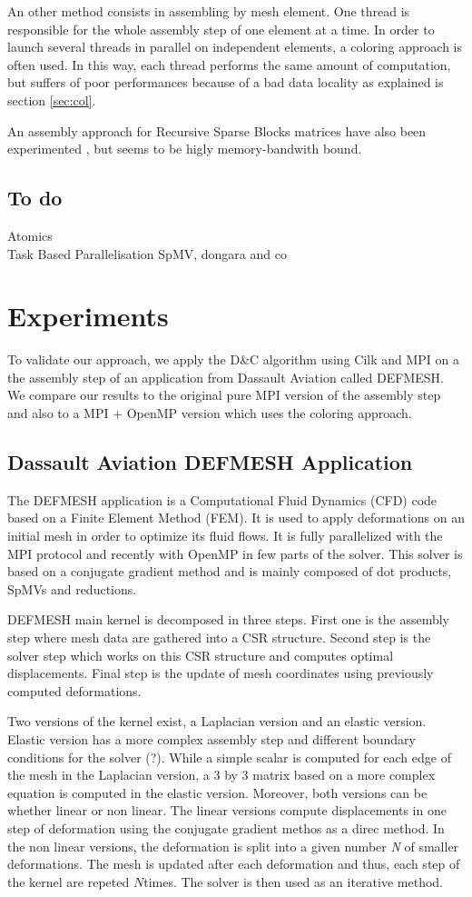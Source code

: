 \documentclass{IOS-Book-Article}
\begin{document}
An other method consists in assembling by mesh element. One thread is responsible for the whole assembly step of one element at a time.
In order to launch several threads in parallel on independent elements, a coloring approach is often used.
In this way, each thread performs the same amount of computation, but suffers of poor performances because of a bad data locality as explained is section \ref{sec:col}.

An assembly approach for Recursive Sparse Blocks matrices have also been experimented \cite{RSBasm}, but seems to be higly memory-bandwith bound.

\subsection{To do}
Atomics\\
Task Based Parallelisation SpMV, dongara and co \cite{MPI_task}\\

\section{Experiments}
To validate our approach, we apply the D\&C algorithm using Cilk and MPI on a the assembly step of an application from Dassault Aviation called DEFMESH.
We compare our results to the original pure MPI version of the assembly step and also to a MPI + OpenMP version which uses the coloring approach.

\subsection{Dassault Aviation DEFMESH Application}
The DEFMESH application is a Computational Fluid Dynamics (CFD) code based on a Finite Element Method (FEM).
It is used to apply deformations on an initial mesh in order to optimize its fluid flows.
It is fully parallelized with the MPI protocol and recently with OpenMP in few parts of the solver.
This solver is based on a conjugate gradient method and is mainly composed of dot products, SpMVs and reductions.

DEFMESH main kernel is decomposed in three steps.
First one is the assembly step where mesh data are gathered into a CSR structure.
Second step is the solver step which works on this CSR structure and computes optimal displacements.
Final step is the update of mesh coordinates using previously computed deformations.

Two versions of the kernel exist, a Laplacian version and an elastic version. Elastic version has a more complex assembly step and different boundary conditions for the solver (?).
While a simple scalar is computed for each edge of the mesh in the Laplacian version, a 3 by 3 matrix based on a more complex equation is computed in the elastic version.
Moreover, both versions can be whether linear or non linear.
The linear versions compute displacements in one step of deformation using the conjugate gradient methos as a direc method.
In the non linear versions, the deformation is split into a given number \emph{N} of smaller deformations.
The mesh is updated after each deformation and thus, each step of the kernel are repeted $N$times. The solver is then used as an iterative method.
\end{document}
